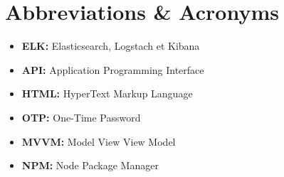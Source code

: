 \chapter*{Abbreviations \& Acronyms}

\begin{itemize}
	\item \textbf{ELK:}  Elasticsearch, Logstach et Kibana
	\item \textbf{API:}  Application Programming Interface
	\item \textbf{HTML:}  HyperText Markup Language
	\item \textbf{OTP:} One-Time Password
	\item \textbf{MVVM:} Model View View Model
	\item \textbf{NPM:} Node Package Manager
\end{itemize}